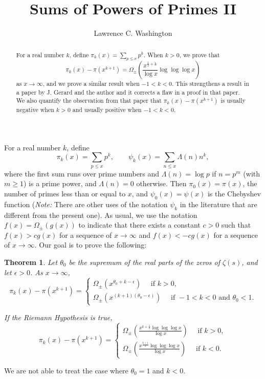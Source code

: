 \documentclass[12pt]{amsart}
\newtheorem{theorem}{Theorem}
\begin{document}
\title[Sums of Powers of Primes]{Sums of Powers of Primes II}

\author{Lawrence C. Washington}
\address{Dept. of Mathematics, Univ. of Maryland, College Park, MD, 20742 USA}
\maketitle


\begin{abstract} For a real number $k$, define $\pi_k(x) = \sum_{p\le x} p^k$. When $k>0$, we prove that
$$
\pi_k(x) - \pi(x^{k+1}) = \Omega_{\pm}\left(\frac{x^{\frac12+k}}{\log x} \log\log\log x\right)
$$
as $x\to\infty$, and we prove a similar result when $-1<k<0$. This strengthens a result in a paper by J. Gerard and the author and it corrects a flaw in a proof in that paper.
We also quantify the observation from that paper that $\pi_k(x) - \pi(x^{k+1})$ is usually negative when $k>0$ and usually positive when $-1<k<0$.
\end{abstract}




For a real number $k$, define 
$$
\pi_k(x) = \sum_{p\le x} p^k,  \qquad  \psi_k(x)= \sum_{n\le x} \Lambda(n) n^k,
$$
where the first sum runs over prime numbers and $\Lambda(n) = \log p$ if $n=p^m$ (with $m\ge 1$) is a prime power, and $\Lambda(n) = 0$ otherwise. Then $\pi_0(x) = \pi(x)$, the number of primes less than or equal to $x$, and $\psi_0(x)=\psi(x)$ is the Chebyshev function ({\it Note:} There are other uses of the notation $\psi_k$ in the literature that are different from the present one). As usual, we use the notation $f(x) = \Omega_{\pm}(g(x))$ to indicate that there exists a constant $c>0$ such that $f(x)> c g(x)$ for a sequence of $x\to\infty$ and $f(x) < -cg(x)$ for a sequence of $x\to\infty$. Our goal is to prove the following:
\begin{theorem} Let  $\theta_0$  be the supremum of the real parts of the zeros of $\zeta(s)$, and let $\epsilon>0$. As $x\to\infty$,
$$
\pi_k(x) - \pi(x^{k+1}) = \begin{cases}
\Omega_{\pm} (x^{\theta_0+k-\epsilon}) \quad \text{ if } k>0,\\
\Omega_{\pm}( x^{(k+1)(\theta_0-\epsilon)}) \quad \text{ if } -1< k < 0 \text{ and } \theta_0<1.
\end{cases}
$$

If the Riemann Hypothesis is true,
$$
\pi_k(x) - \pi(x^{k+1}) = \begin{cases} \Omega_{\pm}\left(\frac{x^{k+\frac12} \log\log\log x}{\log x}\right) \quad \text{ if } k>0,\\
 \Omega_{\pm}\left(\frac{x^{\frac{k+1}2}\log\log\log x}{\log x} \right) \quad \text{ if } k<0.\end{cases}
$$
\end{theorem}
We are not able to treat the case where $\theta_0=1$ and $k<0$. 
\end{document}
